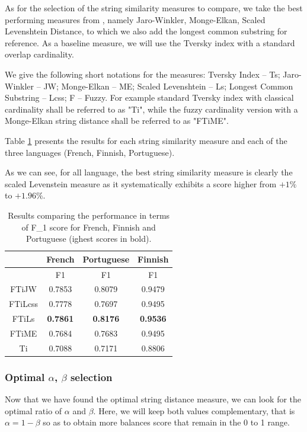 \documentclass[10pt, a4paper]{article}
\begin{document}
As for the selection of the string similarity measures to compare, we take the best performing measures from \cite{Cohen2003}, namely Jaro-Winkler, Monge-Elkan, Scaled Levenshtein Distance, to which we also add the longest common substring for reference. As a baseline measure, we will use the Tversky index with a standard overlap cardinality.

We give the following short notations for the measures: Tversky Index -- Ts; Jaro-Winkler -- JW; Monge-Elkan -- ME; Scaled Levenshtein -- Ls; Longest Common Substring -- Lcss; F -- Fuzzy. For example standard Tversky index with classical cardinality shall be referred to as "Ti", while the fuzzy cardinality version with a Monge-Elkan string distance shall be referred to as "FTiME". 

Table \ref{tab:expe1} presents the results for each string similarity measure and each of the three languages (French, Finnish, Portuguese).

As we can see, for all language, the best string similarity measure is clearly the scaled Levenstein measure as it systematically exhibits a score higher from \(+1\%\) to \(+1.96\%\).

\begin{table}
{\centering \footnotesize
\begin{tabular}{|c|c|c|c|}
\hline &French&Portuguese&Finnish\\
\hline &F1&F1&F1\\
\hline FTiJW&0.7853&0.8079&0.9479\\
\hline FTiLcss&0.7778&0.7697&0.9495\\
\hline FTiLs&\textbf{0.7861}&\textbf{0.8176}&\textbf{0.9536}\\
\hline FTiME&0.7684&0.7683&0.9495\\
\hline Ti&0.7088&0.7171&0.8806\\
\hline 
\end{tabular} 
\caption{Results comparing the performance in terms of F\_1 score for French, Finnish and Portuguese (ighest scores in bold).}
\label{tab:expe1}
}
\end{table}

\subsubsection{Optimal \(\alpha\), \(\beta\) selection}
Now that we have found the optimal string distance measure, we can look for the optimal ratio of \(\alpha\) and \(\beta\). Here, we will keep both values complementary, that is \(\alpha=1-\beta\) so as to obtain more balances score that remain in the 0 to 1 range. 
\end{document}
